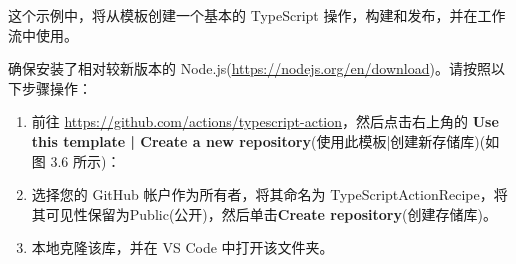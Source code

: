 
这个示例中，将从模板创建一个基本的 TypeScript 操作，构建和发布，并在工作流中使用。


确保安装了相对较新版本的 Node.js(\url{https://nodejs.org/en/download})。请按照以下步骤操作：

\begin{enumerate}
\item 
前往 \url{https://github.com/actions/typescript-action}，然后点击右上角的 \textbf{Use this template | Create a new repository}(使用此模板|创建新存储库)(如图 3.6 所示)：


\item 
选择您的 GitHub 帐户作为所有者，将其命名为 TypeScriptActionRecipe，将其可见性保留为Public(公开)，然后单击\textbf{Create repository}(创建存储库)。

\item 
本地克隆该库，并在 VS Code 中打开该文件夹。
\end{enumerate}


